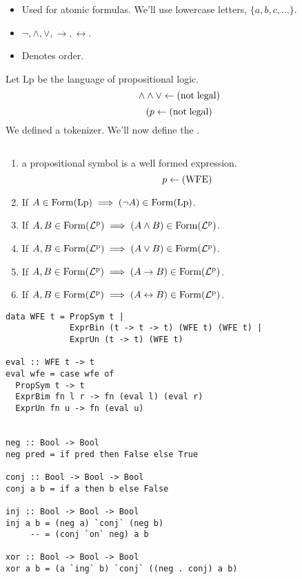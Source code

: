 \documentclass[12pt]{article}
\begin{document}
\bbox
\begin{nota}[Symbols]\label{nota:sym}
  \(\,\)\begin{itemize}
    \item {} Used for atomic formulas. We'll use lowercase 
      letters, \(\{a,b,c,\dots\}\).
    \item {} \(\neg,\wedge,\vee,\to,\leftrightarrow\).
    \item {} Denotes order.
  \end{itemize}
  Let Lp be the language of propositional logic.
  \[\wedge\wedge\vee\leftarrow(\mathrm{not\;legal})\]
  \[(p\leftarrow(\mathrm{not\;legal})\]
  We defined a tokenizer. We'll now define the .
\end{nota}
\ebox


\bbox
\begin{defn}\label{defn:well_exp}
  \(\,\)
  \begin{enumerate}
    \item a propositional symbol is a well formed expression.
      \[p\leftarrow(\mathrm{WFE})\]
    \item If \(A\in\mathrm{Form}(\mathrm{Lp})\implies(\neg A)\in\mathrm{Form}(\mathrm{Lp})\).
    \item If \(A,B\in\mathrm{Form}(\mathrm{\mathcal{L}^p_{}})\implies (A\wedge B)\in\mathrm{Form}(\mathrm{\mathcal{L}^p_{}})\).
    \item If \(A,B\in\mathrm{Form}(\mathrm{\mathcal{L}^p_{}})\implies (A\vee B)\in\mathrm{Form}(\mathrm{\mathcal{L}^p_{}})\).
    \item If \(A,B\in\mathrm{Form}(\mathrm{\mathcal{L}^p_{}})\implies (A\to B)\in\mathrm{Form}(\mathrm{\mathcal{L}^p_{}})\).
    \item If \(A,B\in\mathrm{Form}(\mathrm{\mathcal{L}^p_{}})\implies (A\leftrightarrow B)\in\mathrm{Form}(\mathrm{\mathcal{L}^p_{}})\).
  \end{enumerate}
\end{defn}
\ebox
\begin{verbatim}
data WFE t = PropSym t |
             ExprBin (t -> t -> t) (WFE t) (WFE t) |
             ExprUn (t -> t) (WFE t)

eval :: WFE t -> t
eval wfe = case wfe of
  PropSym t -> t
  ExprBim fn l r -> fn (eval l) (eval r)
  ExprUn fn u -> fn (eval u)


neg :: Bool -> Bool
neg pred = if pred then False else True

conj :: Bool -> Bool -> Bool
conj a b = if a then b else False

inj :: Bool -> Bool -> Bool
inj a b = (neg a) `conj` (neg b)
     -- = (conj `on` neg) a b

xor :: Bool -> Bool -> Bool
xor a b = (a `ing` b) `conj` ((neg . conj) a b)
\end{verbatim}
\end{document}
